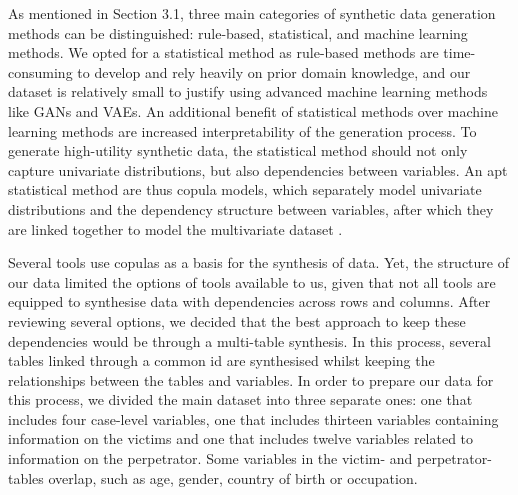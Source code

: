 As mentioned in Section 3.1, three main categories of synthetic data generation methods can be distinguished: rule-based, statistical, and machine learning methods. We opted for a statistical method as rule-based methods are time-consuming to develop and rely heavily on prior domain knowledge, and our dataset is relatively small to justify using advanced machine learning methods like GANs and VAEs. An additional benefit of statistical methods over machine learning methods are increased interpretability of the generation process. To generate high-utility synthetic data, the statistical method should not only capture univariate distributions, but also dependencies between variables. An apt statistical method are thus copula models, which separately model univariate distributions and the dependency structure between variables, after which they are linked together to model the multivariate dataset \cite{nelsen2006introduction}.

Several tools use copulas as a basis for the synthesis of data. Yet, the structure of our data limited the options of tools available to us, given that not all tools are equipped to synthesise data with dependencies across rows and columns. After reviewing several options, we decided that the best approach to keep these dependencies would be through a multi-table synthesis. In this process, several tables linked through a common id are synthesised whilst keeping the relationships between the tables and variables. In order to prepare our data for this process, we divided the main dataset into three separate ones: one that includes four case-level variables, one that includes thirteen variables containing information on the victims and one that includes twelve variables related to information on the perpetrator. Some variables in the victim- and perpetrator-tables overlap, such as age, gender, country of birth or occupation. 

